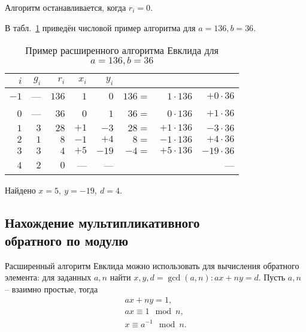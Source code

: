 Алгоритм останавливается, когда $r_i = 0$.


\example
В табл.~\ref{tab:extended-euclid} приведён числовой пример алгоритма для $a=136, b=36$.
\begin{table}[!ht]
    \centering
    \caption{Пример расширенного алгоритма Евклида для \\ $a=136, b=36$\label{tab:extended-euclid}}
    \begin{tabular}{|r|r|r|r|r|rrr|}
        \hline
        $i$ & $g_i$ & $r_i$ & $x_i$ & $y_i$ & & & \\
        \hline
        $-1$ &  --- & $136$ &   $1$ &   $0$ & $136 =$ & $ 1 \cdot 136$ & $ + 0 \cdot 36$ \\
	 $0$ &  --- &  $36$ &   $0$ &   $1$ &  $36 =$ & $ 0 \cdot 136$ & $ + 1 \cdot 36$ \\
	 $1$ &  $3$ &  $28$ &  $+1$ &  $-3$ &  $28 =$ & $+1 \cdot 136$ & $ - 3 \cdot 36$ \\
	 $2$ &  $1$ &   $8$ &  $-1$ &  $+4$ &   $8 =$ & $-1 \cdot 136$ & $ + 4 \cdot 36$ \\
	 $3$ &  $3$ &   $4$ &  $+5$ & $-19$ &  $-4 =$ & $+5 \cdot 136$ & $- 19 \cdot 36$ \\
	 $4$ &  $2$ &   $0$ &   --- &   --- & & & --- \\
        \hline
    \end{tabular}
\end{table}
Найдено $x = 5, ~ y = -19, ~ d = 4$.
\exampleend

\subsection[Нахождение мультипликативного обратного]{Нахождение мультипликативного \protect\\ обратного по модулю}

Расширенный алгоритм Евклида можно использовать для вычисления обратного элемента: для заданных $a, n$ найти $x, y, d = \gcd(a,n): ax + ny = d$. Пусть $a,n$ -- взаимно простые, тогда
\[\begin{array}{l}
	ax + ny = 1, \\
	ax \equiv 1 \mod n, \\
	x \equiv a^{-1} \mod n. \\
\end{array}\]

